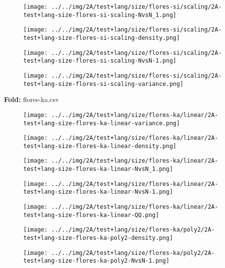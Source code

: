 \begin{figure}[H]
\centering	\texttt{[image: ../../img/2A/test+lang/size/flores-si/scaling/2A-test+lang-size-flores-si-scaling-NvsN\_1.png]}
\end{figure}
\begin{figure}[H]
\centering	\texttt{[image: ../../img/2A/test+lang/size/flores-si/scaling/2A-test+lang-size-flores-si-scaling-density.png]}
\end{figure}
\begin{figure}[H]
\centering	\texttt{[image: ../../img/2A/test+lang/size/flores-si/scaling/2A-test+lang-size-flores-si-scaling-NvsN-1.png]}
\end{figure}
\begin{figure}[H]
\centering	\texttt{[image: ../../img/2A/test+lang/size/flores-si/scaling/2A-test+lang-size-flores-si-scaling-variance.png]}
\end{figure}
\textbf{Fold:} flores-ka.csv
\begin{figure}[H]
\centering	\texttt{[image: ../../img/2A/test+lang/size/flores-ka/linear/2A-test+lang-size-flores-ka-linear-variance.png]}
\end{figure}
\begin{figure}[H]
\centering	\texttt{[image: ../../img/2A/test+lang/size/flores-ka/linear/2A-test+lang-size-flores-ka-linear-density.png]}
\end{figure}
\begin{figure}[H]
\centering	\texttt{[image: ../../img/2A/test+lang/size/flores-ka/linear/2A-test+lang-size-flores-ka-linear-NvsN\_1.png]}
\end{figure}
\begin{figure}[H]
\centering	\texttt{[image: ../../img/2A/test+lang/size/flores-ka/linear/2A-test+lang-size-flores-ka-linear-NvsN-1.png]}
\end{figure}
\begin{figure}[H]
\centering	\texttt{[image: ../../img/2A/test+lang/size/flores-ka/linear/2A-test+lang-size-flores-ka-linear-QQ.png]}
\end{figure}
\begin{figure}[H]
\centering	\texttt{[image: ../../img/2A/test+lang/size/flores-ka/poly2/2A-test+lang-size-flores-ka-poly2-density.png]}
\end{figure}
\begin{figure}[H]
\centering	\texttt{[image: ../../img/2A/test+lang/size/flores-ka/poly2/2A-test+lang-size-flores-ka-poly2-NvsN-1.png]}
\end{figure}
